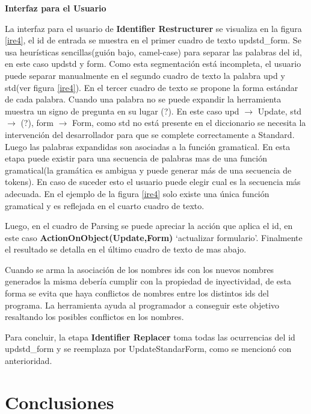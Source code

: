 \documentclass[a4paper,12pt]{report}
\begin{document}
\pagebreak
\noindent \textbf{Interfaz para el Usuario\\}

La interfaz para el usuario de \textbf{Identifier Restructurer} se visualiza en la figura \ref{ire4}, el id de entrada se muestra en el primer cuadro de texto \textsf{updstd\_form}. Se usa heurísticas sencillas(guión bajo, camel-case) para separar las palabras del id, en este caso \textsf{updstd} y \textsf{form}. Como esta segmentación está incompleta, el usuario puede separar manualmente en el segundo cuadro de texto la palabra \textsf{upd} y \textsf{std}(ver figura \ref{ire4}). En el tercer cuadro de texto se propone la forma estándar de cada palabra. Cuando una palabra no se puede expandir la herramienta muestra un signo de pregunta en su lugar (?). En este caso \textsf{upd} $\rightarrow$ \textsf{Update}, \textsf{std} $\rightarrow$ (?), \textsf{form} $\rightarrow$ \textsf{Form}, como \textsf{std} no está presente en el diccionario se necesita la intervención del desarrollador para que se complete correctamente a \textsf{Standard}. Luego las palabras expandidas son asociadas a la función gramatical. En esta etapa puede existir para una secuencia de palabras mas de una función gramatical(la gramática es ambigua y puede generar más de una secuencia de tokens). En caso de suceder esto el usuario puede elegir cual es la secuencia más adecuada. En el ejemplo de la figura \ref{ire4} solo existe una única función gramatical y es reflejada en el cuarto cuadro de texto. 

Luego, en el cuadro de Parsing se puede apreciar la acción que aplica el id, en este caso \textbf{ActionOnObject(Update,Form)} `actualizar formulario'. Finalmente el resultado se detalla en el último cuadro de texto de mas abajo.

Cuando se arma la asociación de los nombres ids con los nuevos nombres generados la misma debería cumplir con la propiedad de inyectividad, de esta forma se evita que haya conflictos de nombres entre los distintos ids del programa. La herramienta ayuda al programador a conseguir este objetivo resaltando los posibles conflictos en los nombres.

Para concluir, la etapa \textbf{Identifier Replacer} toma todas las ocurrencias del id \textsf{updstd\_form} y se reemplaza por \textsf{UpdateStandarForm}, como se mencionó con anterioridad.

\section{Conclusiones}
\end{document}
